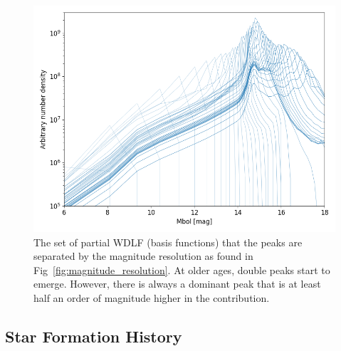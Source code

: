 \documentclass[fleqn,usenatbib]{mnras}
\begin{document}
\begin{figure}
    \includegraphics[width=\columnwidth]{figures/fig_04_basis_pwdlf.png}
    \caption{The set of partial WDLF (basis functions) that the peaks are
    separated by the magnitude resolution as found in
    Fig~\ref{fig:magnitude_resolution}. At older ages, double peaks start to
    emerge. However, there is always a dominant peak that is at least half an
    order of magnitude higher in the contribution.}
    \label{fig:basis_pwdlf}
\end{figure}

\subsection{Star Formation History}
\end{document}
